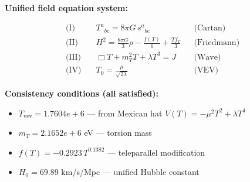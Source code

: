 
\textbf{Unified field equation system:}

\begin{align}
  \text{(I)} \quad & T^a{}_{bc} = 8\pi G \, s^a{}_{bc} && \text{(Cartan)} \\
  \text{(II)} \quad & H^2 = \frac{8\pi G}{3}\rho - \frac{f(T)}{6} + \frac{Tf_T}{3} && \text{(Friedmann)} \\
  \text{(III)} \quad & \Box T + m_T^2 T + \lambda T^3 = J && \text{(Wave)} \\
  \text{(IV)} \quad & T_0 = \frac{\mu}{\sqrt{2\lambda}} && \text{(VEV)}
\end{align}

\textbf{Consistency conditions (all satisfied):}
\begin{itemize}
  \item $T_{\text{vev}} = 1.7604e+6$ — from Mexican hat $V(T) = -\mu^2 T^2 + \lambda T^4$
  \item $m_T = 2.1652e+6$ eV — torsion mass
  \item $f(T) = -0.2923 \, T^{0.1382}$ — teleparallel modification
  \item $H_0 = 69.89$ km/s/Mpc — unified Hubble constant
\end{itemize}